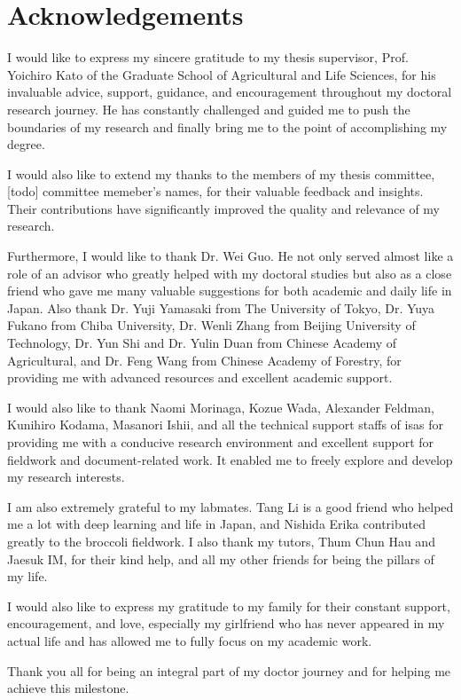 \chapter*{Acknowledgements}

I would like to express my sincere gratitude to my thesis supervisor, Prof. Yoichiro Kato of the Graduate School of Agricultural and Life Sciences, for his invaluable advice, support, guidance, and encouragement throughout my doctoral research journey. He has constantly challenged and guided me to push the boundaries of my research and finally bring me to the point of accomplishing my degree.

I would also like to extend my thanks to the members of my thesis committee, [todo] committee memeber's names, for their valuable feedback and insights. Their contributions have significantly improved the quality and relevance of my research.

Furthermore, I would like to thank Dr. Wei Guo. He not only served almost like a role of an advisor who greatly helped with my doctoral studies but also as a close friend who gave me many valuable suggestions for both academic and daily life in Japan. Also thank Dr. Yuji Yamasaki from The University of Tokyo, Dr. Yuya Fukano from Chiba University, Dr. Wenli Zhang from Beijing University of Technology, Dr. Yun Shi and Dr. Yulin Duan from Chinese Academy of Agricultural, and Dr. Feng Wang from Chinese Academy of Forestry, for providing me with advanced resources and excellent academic support.

I would also like to thank Naomi Morinaga, Kozue Wada, Alexander Feldman, Kunihiro Kodama, Masanori Ishii, and all the technical support staffs of \gls{isas} for providing me with a conducive research environment and excellent support for fieldwork and document-related work. It enabled me to freely explore and develop my research interests.

I am also extremely grateful to my labmates. Tang Li is a good friend who helped me a lot with deep learning and life in Japan, and Nishida Erika contributed greatly to the broccoli fieldwork. I also thank my tutors, Thum Chun Hau and Jaesuk IM, for their kind help, and all my other friends for being the pillars of my life.

I would also like to express my gratitude to my family for their constant support, encouragement, and love, especially my girlfriend who has never appeared in my actual life and has allowed me to fully focus on my academic work.

Thank you all for being an integral part of my doctor journey and for helping me achieve this milestone.